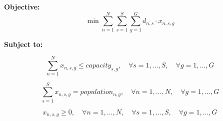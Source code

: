 \documentclass{article}
\begin{document}
\textbf{Objective:}
\[
\min \sum_{n=1}^{N} \sum_{s=1}^{S} \sum_{g=1}^{G} d_{n,s} \cdot x_{n,s,g}
\]

\textbf{Subject to:}

\[
\sum_{n=1}^{N} x_{n,s,g} \leq capacity_{s,g}, \quad \forall s = 1, \ldots, S, \quad \forall g = 1, \ldots, G
\]

\[
\sum_{s=1}^{S} x_{n,s,g} = population_{n,g}, \quad \forall n = 1, \ldots, N, \quad \forall g = 1, \ldots, G
\]

\[
x_{n,s,g} \geq 0, \quad \forall n = 1, \ldots, N, \quad \forall s = 1, \ldots, S, \quad \forall g = 1, \ldots, G
\]
\end{document}
